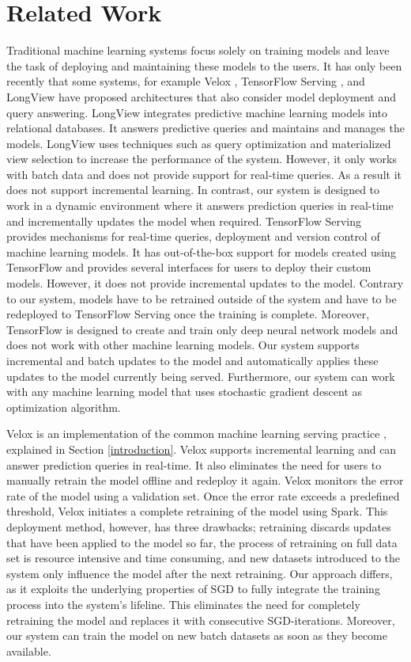 \documentclass{vldb}
\begin{document}
\section{Related Work} \label{related-work}
Traditional machine learning systems focus solely on training models and leave the task of deploying and maintaining these models to the users.
It has only been recently that some systems, for example Velox \cite{crankshaw2014missing}, TensorFlow Serving \cite{abadi2016tensorflow}, and LongView \cite{akdere2011case} have proposed architectures that also consider model deployment and query answering.
LongView integrates predictive machine learning models into relational databases. 
It answers predictive queries and maintains and manages the models.
LongView uses techniques such as query optimization and materialized view selection to increase the performance of the system.
However, it only works with batch data and does not provide support for real-time queries. 
As a result it does not support incremental learning.
In contrast, our system is designed to work in a dynamic environment where it answers prediction queries in real-time and incrementally updates the model when required.
TensorFlow Serving provides mechanisms for real-time queries, deployment and version control of machine learning models.
It has out-of-the-box support for models created using TensorFlow and provides several interfaces for users to deploy their custom models.
However, it does not provide incremental updates to the model.
Contrary to our system, models have to be retrained outside of the system and have to be redeployed to TensorFlow Serving once the training is complete.
Moreover, TensorFlow is designed to create and train only deep neural network models and does not work with other machine learning models.
Our system supports incremental and batch updates to the model and automatically applies these updates to the model currently being served.
Furthermore, our system can work with any machine learning model that uses stochastic gradient descent as optimization algorithm.

Velox is an implementation of the common machine learning serving practice \cite{crankshaw2014missing}, explained in Section \ref{introduction}.
Velox supports incremental learning and can answer prediction queries in real-time.
It also eliminates the need for users to manually retrain the model offline and redeploy it again.
Velox monitors the error rate of the model using a validation set.
Once the error rate exceeds a predefined threshold, Velox initiates a complete retraining of the model using Spark. 
This deployment method, however, has three drawbacks; retraining discards updates that have been applied to the model so far, the process of retraining on full data set is resource intensive and time consuming, and new datasets introduced to the system only influence the model after the next retraining.
Our approach differs, as it exploits the underlying properties of SGD to fully integrate the training process into the system's lifeline.
This eliminates the need for completely retraining the model and replaces it with consecutive SGD-iterations.
Moreover, our system can train the model on new batch datasets as soon as they become available.
\end{document}
